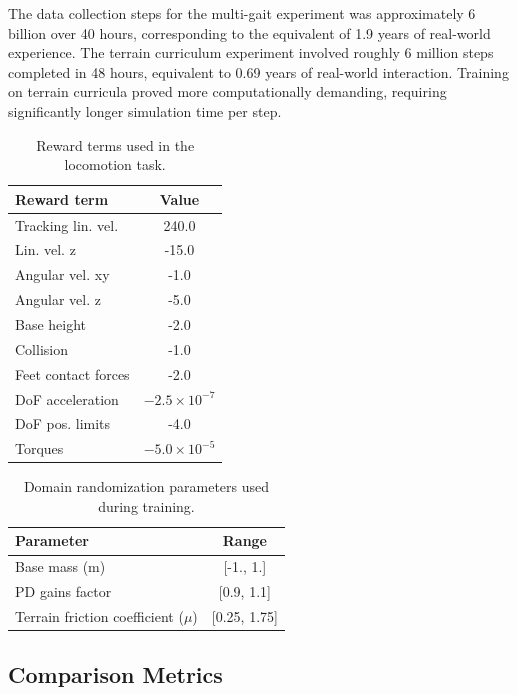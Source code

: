 \documentclass[letterpaper, 10pt, conference]{IEEEtran}
\begin{document}
The data collection steps for the multi-gait experiment was approximately 6 billion over 40 hours, corresponding to the equivalent of 1.9 years of real-world experience. The terrain curriculum experiment involved roughly 6 million steps completed in 48 hours, equivalent to 0.69 years of real-world interaction. Training on terrain curricula proved more computationally demanding, requiring significantly longer simulation time per step.

\begin{table}[h]
\caption{Reward terms used in the locomotion task.}
\label{tab:rewards}
\centering
\begin{tabular}{lc}
\toprule
\textbf{Reward term} & \textbf{Value} \\
\midrule
Tracking lin. vel. & 240.0 \\
Lin. vel. z & -15.0 \\
Angular vel. xy & -1.0 \\
Angular vel. z & -5.0 \\
Base height & -2.0 \\
Collision & -1.0 \\
Feet contact forces & -2.0 \\
DoF acceleration & $-2.5\times10^{-7}$ \\
DoF pos. limits & -4.0 \\
Torques & $-5.0\times10^{-5}$ \\
\bottomrule
\end{tabular}
\end{table}

\begin{table}[h]
\caption{Domain randomization parameters used during training.}
\label{tab:domain_rand}
\centering
\begin{tabular}{lc}
\toprule
\textbf{Parameter} & \textbf{Range} \\
\midrule
Base mass (m) & [-1., 1.] \\
PD gains factor & [0.9, 1.1] \\
Terrain friction coefficient ($\mu$) & [0.25, 1.75] \\
\bottomrule
\end{tabular}
\end{table}

\subsection{Comparison Metrics}
\end{document}
